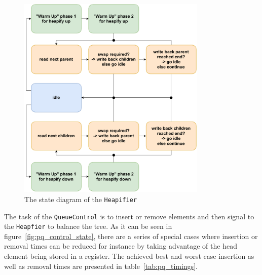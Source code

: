 \documentclass[conference]{IEEEtran}
\begin{document}
\begin{figure}
	\centering
	\includegraphics[width=9cm]{HeapifierStateDiagram.pdf}
	\caption{The state diagram of the \texttt{Heapifier}}
	\label{fig:pq_heapifier_state}
\end{figure}

The task of the \texttt{QueueControl} is to insert or remove elements and then signal to the \texttt{Heapfier} to balance the tree. As it can be seen in figure~\ref{fig:pq_control_state}, there are a series of special cases where insertion or removal times can be reduced for instance by taking advantage of the head element
being stored in a register. The achieved best and worst case insertion as well as removal times are presented in table~\ref{tab:pq_timings}.
\end{document}
